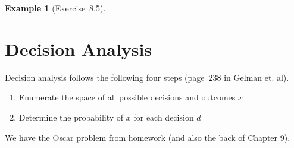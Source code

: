 \documentclass{article}
\newtheorem{example}{Example}
\begin{document}
\begin{example}[Exercise~8.5]
\end{example}

\section{Decision Analysis}

Decision analysis follows the following four steps (page~$238$ in Gelman et. al).
\begin{enumerate}
	\item 
		Enumerate the space of all possible decisions and outcomes $x$
	\item
		Determine the probability of $x$ for each decision $d$
\end{enumerate}

We have the Oscar problem from homework (and also the back of Chapter 9).
\end{document}
